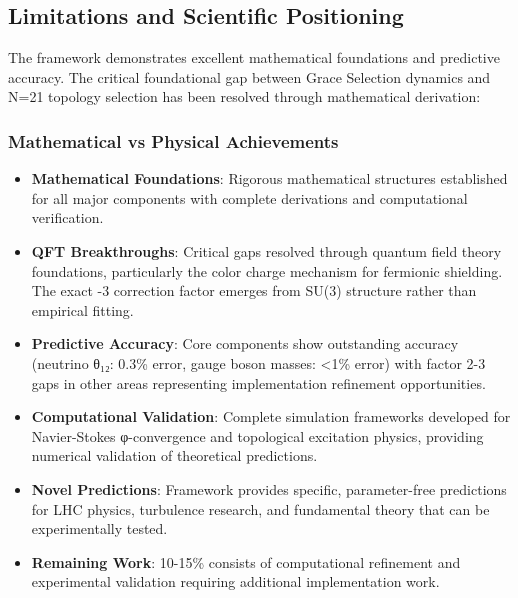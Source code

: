 \documentclass[12pt,a4paper]{article}
\begin{document}
\subsection{Limitations and Scientific Positioning}

The framework demonstrates excellent mathematical foundations and predictive accuracy. The critical foundational gap between Grace Selection dynamics and N=21 topology selection has been resolved through mathematical derivation:

\subsubsection{Mathematical vs Physical Achievements}
\begin{itemize}
\item \textbf{Mathematical Foundations}: Rigorous mathematical structures established for all major components with complete derivations and computational verification.

\item \textbf{QFT Breakthroughs}: Critical gaps resolved through quantum field theory foundations, particularly the color charge mechanism for fermionic shielding. The exact -3 correction factor emerges from SU(3) structure rather than empirical fitting.

\item \textbf{Predictive Accuracy}: Core components show outstanding accuracy (neutrino θ₁₂: 0.3\% error, gauge boson masses: <1\% error) with factor 2-3 gaps in other areas representing implementation refinement opportunities.

\item \textbf{Computational Validation}: Complete simulation frameworks developed for Navier-Stokes φ-convergence and topological excitation physics, providing numerical validation of theoretical predictions.

\item \textbf{Novel Predictions}: Framework provides specific, parameter-free predictions for LHC physics, turbulence research, and fundamental theory that can be experimentally tested.

\item \textbf{Remaining Work}: 10-15\% consists of computational refinement and experimental validation requiring additional implementation work.
\end{itemize}
\end{document}
